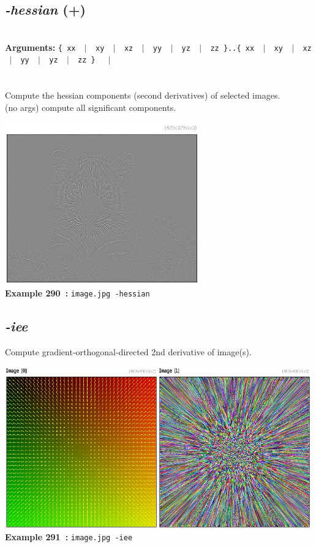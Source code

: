 \documentclass[a4paper,11pt,twoside]{book}
\begin{document}
\subsection{\emph{-hessian} (+)}\vspace*{-0.5em}
~\\\textbf{Arguments: } 
{\small \texttt{\{ xx ~$|$~ xy ~$|$~ xz ~$|$~ yy ~$|$~ yz ~$|$~ zz \}..\{ xx ~$|$~ xy ~$|$~ xz ~$|$~ yy ~$|$~ yz ~$|$~ zz \}}}~~~$|$\\
\\~\\
Compute the hessian components (second derivatives) of selected images.
~\\(no args) compute all significant components.
\begin{center}\includegraphics[keepaspectratio=true,height=7cm,width=\textwidth]{img/gmic_def290.jpg}\\
{\footnotesize \textbf{Example 290~:} \texttt{image.jpg -hessian}}
\end{center}

\subsection{\emph{-iee} }\vspace*{-0.5em}
Compute gradient-orthogonal-directed 2nd derivative of image(s).
\begin{center}\includegraphics[keepaspectratio=true,height=7cm,width=\textwidth]{img/gmic_def291.jpg}\\
{\footnotesize \textbf{Example 291~:} \texttt{image.jpg -iee}}
\end{center}
\end{document}

